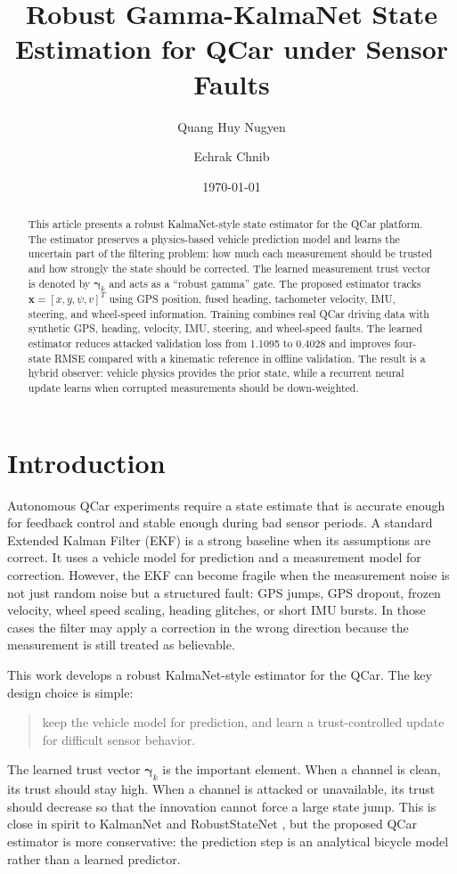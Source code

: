 \documentclass[11pt,a4paper]{article}
\title{\vspace{-1em}Robust Gamma-KalmaNet State Estimation for QCar under Sensor Faults}
\author{Quang Huy Nugyen \and Echrak Chnib}
\date{\today}
\newcommand{\state}{\bm{x}}
\newcommand{\trust}{\bm{\gamma}}
\begin{document}
\maketitle

\begin{abstract}
This article presents a robust KalmaNet-style state estimator for the QCar
platform. The estimator preserves a physics-based vehicle prediction model and
learns the uncertain part of the filtering problem: how much each measurement
should be trusted and how strongly the state should be corrected. The learned
measurement trust vector is denoted by $\trust_k$ and acts as a ``robust
gamma'' gate. The proposed estimator tracks $\state=[x,y,\psi,v]^T$ using GPS
position, fused heading, tachometer velocity, IMU, steering, and wheel-speed
information. Training combines real QCar driving data with synthetic GPS,
heading, velocity, IMU, steering, and wheel-speed faults. The learned estimator
reduces attacked validation loss from 1.1095 to 0.4028 and improves four-state
RMSE compared with a kinematic reference in offline validation. The result is a
hybrid observer: vehicle physics provides the prior state, while a recurrent
neural update learns when corrupted measurements should be down-weighted.
\end{abstract}

\section{Introduction}

Autonomous QCar experiments require a state estimate that is accurate enough
for feedback control and stable enough during bad sensor periods. A standard
Extended Kalman Filter (EKF) is a strong baseline when its assumptions are
correct. It uses a vehicle model for prediction and a measurement model for
correction. However, the EKF can become fragile when the measurement noise is
not just random noise but a structured fault: GPS jumps, GPS dropout, frozen
velocity, wheel speed scaling, heading glitches, or short IMU bursts. In those
cases the filter may apply a correction in the wrong direction because the
measurement is still treated as believable.

This work develops a robust KalmaNet-style estimator for the QCar.
The key design choice is simple:
\begin{quote}
  keep the vehicle model for prediction, and learn a trust-controlled update
  for difficult sensor behavior.
\end{quote}
The learned trust vector $\trust_k$ is the important element. When a channel is
clean, its trust should stay high. When a channel is attacked or unavailable,
its trust should decrease so that the innovation cannot force a large state
jump. This is close in spirit to KalmanNet \cite{revach2022kalmannet} and
RobustStateNet \cite{dahal2024robuststatenet}, but the proposed QCar estimator
is more conservative: the prediction step is an analytical bicycle model rather
than a learned predictor.
\end{document}
